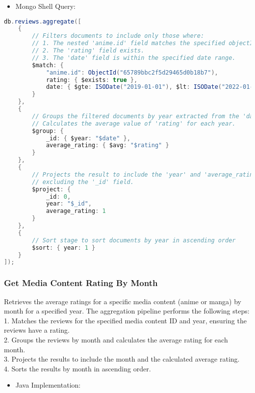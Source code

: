 \begin{itemize}
    \item Mongo Shell Query:
\end{itemize}

\begin{mdframed}[style=customstyle2]
    \begin{lstlisting}[language=java, backgroundcolor=\color{white}]
db.reviews.aggregate([
    {
        // Filters documents to include only those where:
        // 1. The nested 'anime.id' field matches the specified objectId.
        // 2. The 'rating' field exists.
        // 3. The 'date' field is within the specified date range.
        $match: {
            "anime.id": ObjectId("65789bbc2f5d29465d0b18b7"),
            rating: { $exists: true },
            date: { $gte: ISODate("2019-01-01"), $lt: ISODate("2022-01-01") }
        }
    },
    {
        // Groups the filtered documents by year extracted from the 'date' field.
        // Calculates the average value of 'rating' for each year.
        $group: {
            _id: { $year: "$date" },
            average_rating: { $avg: "$rating" }
        }
    },
    {
        // Projects the result to include the 'year' and 'average_rating' fields,
        // excluding the '_id' field.
        $project: {
            _id: 0,
            year: "$_id",
            average_rating: 1
        }
    },
    {
        // Sort stage to sort documents by year in ascending order
        $sort: { year: 1 }
    }
]);\end{lstlisting}
\end{mdframed}

\subsubsection*{Get Media Content Rating By Month}

Retrieves the average ratings for a specific media content (anime or manga) by month for a specified year.
The aggregation pipeline performs the following steps:\\
1. Matches the reviews for the specified media content ID and year, ensuring the reviews have a rating.\\
2. Groups the reviews by month and calculates the average rating for each month.\\
3. Projects the results to include the month and the calculated average rating.\\
4. Sorts the results by month in ascending order.
\begin{itemize}
    \item Java Implementation:
\end{itemize}

